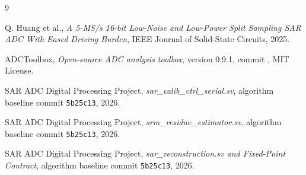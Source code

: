 \documentclass[11pt,a4paper,UTF8,fontset=none,openany]{ctexrep}
\numberwithin{equation}{chapter}
\numberwithin{figure}{chapter}
\numberwithin{table}{chapter}
\newcommand{\commitid}{\texttt{5b25c13}}
\begin{document}
\begin{thebibliography}{9}

Q. Huang et al.,
\emph{A 5-MS/s 16-bit Low-Noise and Low-Power Split Sampling SAR ADC
With Eased Driving Burden},
IEEE Journal of Solid-State Circuits, 2025.

ADCToolbox,
\emph{Open-source ADC analysis toolbox},
version 0.9.1, commit
,
MIT License.

SAR ADC Digital Processing Project,
\emph{sar\_calib\_ctrl\_serial.sv},
algorithm baseline commit \commitid, 2026.

SAR ADC Digital Processing Project,
\emph{srm\_residue\_estimator.sv},
algorithm baseline commit \commitid, 2026.

SAR ADC Digital Processing Project,
\emph{sar\_reconstruction.sv and Fixed-Point Contract},
algorithm baseline commit \commitid, 2026.

\end{thebibliography}
\end{document}
